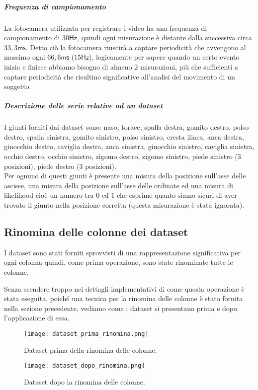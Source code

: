 \subparagraph*{Frequenza di campionamento}
La fotocamera utilizzata per registrare i video ha una frequenza di campionamento di 
$30\mathsf{Hz}$, quindi ogni misurazione è distante dalla successiva circa $33,3\mathsf{ms}$.
Detto ciò la fotocamera riuscirà a captare periodicità che avvengono al massimo ogni $66,6\mathsf{ms}$
($15\mathsf{Hz}$), logicamente per sapere quando un certo evento inizia e finisce abbiamo
bisogno di almeno $2$ misurazioni, più che sufficienti a captare periodicità che risultino
significative all'analisi del movimento di un soggetto.

\subparagraph*{Descrizione delle serie relative ad un dataset}
I giunti forniti dai dataset sono: naso, torace, spalla destra, gomito destro, polso destro, 
spalla sinistra, gomito sinistro, polso sinistro, cresta iliaca, anca destra, ginocchio destro, 
caviglia destra, anca sinistra, ginocchio sinistro, caviglia sinistra, occhio destro, 
occhio sinistro, zigomo destro, zigomo sinistro, piede sinistro ($3$ posizioni), 
piede destro ($3$ posizioni).\\
Per ognuno di questi giunti è presente una misura della posizione sull'asse delle ascisse, 
una misura della posizione sull'asse delle ordinate ed una misura di likelihood cioè un numero
tra $0$ ed $1$ che esprime quanto siamo sicuri di aver trovato il giunto nella posizione corretta
(questa misurazione è stata ignorata).

\subsection{Rinomina delle colonne dei dataset}
I dataset sono stati forniti sprovvisti di una rappresentazione significativa per ogni colonna
quindi, come prima operazione, sono state rinominate tutte le colonne.

Senza scendere troppo nei dettagli implementativi di come questa operazione è stata eseguita,
poiché una tecnica per la rinomina delle colonne è stato fornita nella sezione precedente,
vediamo come i dataset si presentano prima e dopo l'applicazione di essa.

\begin{figure}[H]
    \centering
    \texttt{[image: dataset\_prima\_rinomina.png]}
    \caption{Dataset prima della rinomina delle colonne.}
    \label{fig:ds_prima_rinomina}
\end{figure}

\begin{figure}[H]
    \centering
    \texttt{[image: dataset\_dopo\_rinomina.png]}
    \caption{Dataset dopo la rinomina delle colonne.}
    \label{fig:ds_dopo_rinomina}
\end{figure}

